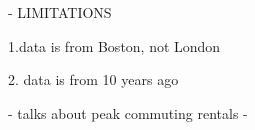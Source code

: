 - LIMITATIONS

1.data is from Boston, not London

2. data is from 10 years ago




- talks about peak commuting rentals
- 

\begin{comment}
\section{Questions for TA session}
- peak hours to be used for 2nd part analysis or general is good?
- should we look for tests that do not assume independence
- 


    

\subsection{Mann-Whitney U Test}


Also known as the Wilcoxon rank-sum test.

\paragraph{Assumptions}

The data are random independent samples $X_i, ..., X_m$, and $Y_i, ..., Y_m$ from two distributions with CDFs $F$ and $G$, satisfying:
1. Each sample is i.i.d.
2. Both samples are mutually independent.

\paragraph{Null and Alternate Hypotheses}

Null hypothesis: $F(x) = G(x)$ for all $x$, i.e., both populations have the same distribution.

Alternative hypothesis (one-sided test): $F(x) \geq G(x)$ with strict inequality for some $x$.

\paragraph{Test Statistic} Let $S_1, ..., S_n$ denote the ranks of $Y_1,...,Y_n$. Then the test statistic is

\[W = \sum_{j=1}^{n} S_n \]

For a test of power $\alpha$ we reject $H_0$ if $W \geq w_{\alpha}$ where $w_{\alpha}$ is the upper $\alpha$-point of the distribution of $W$.


\end{comment}
